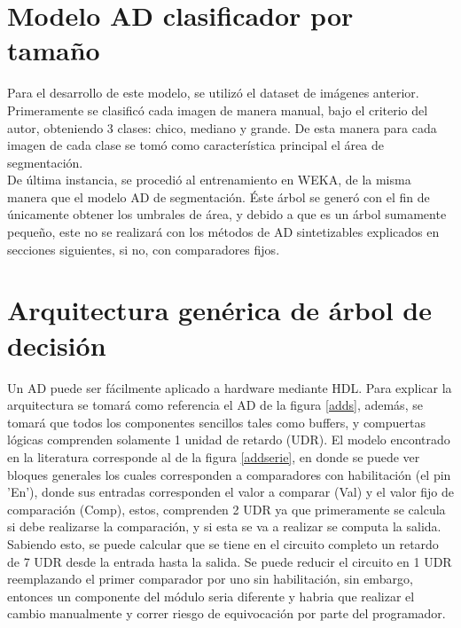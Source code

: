 \documentclass[twoside,spanish,ESP,MSc]{plantillaLabUPV}
\theoremstyle{definition}
\begin{document}
\section{Modelo AD clasificador por tamaño}

Para el desarrollo de este modelo, se utilizó el dataset de imágenes anterior. Primeramente se clasificó cada imagen de manera manual, bajo el criterio del autor, obteniendo 3 clases: chico, mediano y grande. De esta manera para cada imagen de cada clase se tomó como característica principal el área de segmentación.\\

De última instancia, se procedió al entrenamiento en WEKA, de la misma manera que el modelo AD de segmentación. Éste árbol se generó con el fin de únicamente obtener los umbrales de área, y debido a que es un árbol sumamente pequeño, este no se realizará con los métodos de AD sintetizables explicados en secciones siguientes, si no, con comparadores fijos.


\section{Arquitectura genérica de árbol de decisión}

Un AD puede ser fácilmente aplicado a hardware mediante HDL. Para explicar la arquitectura se tomará como referencia el AD de la figura \ref{adds}, además, se tomará que todos los componentes sencillos tales como buffers, y compuertas lógicas comprenden solamente 1 unidad de retardo (UDR). El modelo encontrado en la literatura corresponde al de la figura \ref{addserie}, en donde se puede ver bloques generales los cuales corresponden a comparadores con habilitación (el pin 'En'), donde sus entradas corresponden el valor a comparar (Val) y el valor fijo de comparación (Comp), estos, comprenden 2 UDR ya que primeramente se calcula si debe realizarse la comparación, y si esta se va a realizar se computa la salida. Sabiendo esto, se puede calcular que se tiene en el circuito completo un retardo de 7 UDR desde la entrada hasta la salida. Se puede reducir el circuito en 1 UDR reemplazando el primer comparador por uno sin habilitación, sin embargo, entonces un componente del módulo seria diferente y habria que realizar el cambio manualmente y correr riesgo de equivocación por parte del programador.
\end{document}
